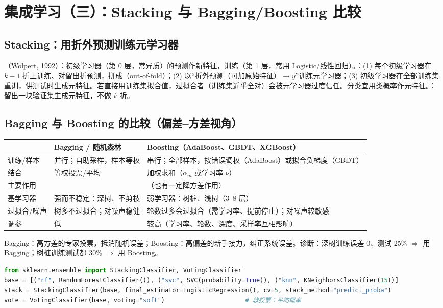 \section{集成学习（三）：Stacking 与 Bagging/Boosting 比较}

\subsection{Stacking：用折外预测训练元学习器}
（Wolpert, 1992）：初级学习器（第 0 层，常异质）的预测作新特征，训练（第 1 层，常用 Logistic/线性回归）。：(1) 每个初级学习器在 $k-1$ 折上训练、对留出折预测，拼成（out-of-fold）；(2) 以“折外预测（可加原始特征）$\to y$”训练元学习器；(3) 初级学习器在全部训练集重训，供测试时生成元特征。若直接用训练集拟合值，过拟合者（训练集近乎全对）会被元学习器过度信任。分类宜用类概率作元特征。：留出一块验证集生成元特征，不做 $k$ 折。

\subsection{Bagging 与 Boosting 的比较（偏差–方差视角）}
\begin{center}\small
\begin{tabularx}{\linewidth}{@{}p{1.9cm}LL@{}}
\toprule
& Bagging / 随机森林 & Boosting（AdaBoost、GBDT、XGBoost） \\
\midrule
训练/样本 & 并行；自助采样，样本等权 & 串行；全部样本，按错误调权（AdaBoost）或拟合负梯度（GBDT）\\
结合 & 等权投票/平均 & 加权求和（$\alpha_m$ 或学习率 $\nu$）\\
主要作用 &  & （也有一定降方差作用） \\
基学习器 & 强而不稳定：深树、不剪枝 & 弱学习器：树桩、浅树（3–8 层）\\
过拟合/噪声 & 树多不过拟合；对噪声稳健 & 轮数过多会过拟合（需学习率、提前停止）；对噪声较敏感 \\
调参 & 低 & 较高（学习率、轮数、深度、采样率互相影响） \\
\bottomrule
\end{tabularx}
\end{center}
Bagging：高方差的专家投票，抵消随机误差；Boosting：高偏差的新手接力，纠正系统误差。诊断：深树训练误差 0、测试 25\% $\Rightarrow$ 用 Bagging；树桩训练测试都 30\% $\Rightarrow$ 用 Boosting。
\begin{lstlisting}[language=Python,basicstyle=\ttfamily\footnotesize]
from sklearn.ensemble import StackingClassifier, VotingClassifier
base = [("rf", RandomForestClassifier()), ("svc", SVC(probability=True)), ("knn", KNeighborsClassifier(15))]
stack = StackingClassifier(base, final_estimator=LogisticRegression(), cv=5, stack_method="predict_proba")
vote = VotingClassifier(base, voting="soft")                      # 软投票：平均概率
\end{lstlisting}

